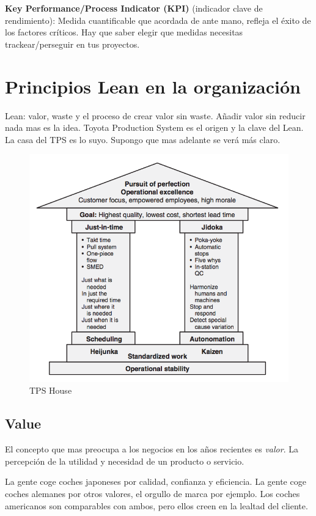 \documentclass[]{article}
\begin{document}
\textbf{Key Performance/Process Indicator (KPI)} (indicador clave de rendimiento): Medida cuantificable que acordada de ante mano, refleja el éxito de los factores críticos. Hay que saber elegir que medidas necesitas trackear/perseguir en tus proyectos. 

\section{Principios Lean en la organización}

Lean: valor, waste y el proceso de crear valor sin waste. Añadir valor sin reducir nada mas es la idea. Toyota Production System es el origen y la clave del Lean. La casa del TPS es lo suyo. Supongo que mas adelante se verá más claro.

\begin{figure}[ht!]
	\centering
	\includegraphics[width=120mm]{imagenes/TPSHouse.png}
	\caption{TPS House}
	\label{fig:TPS House}
\end{figure}

\subsection{Value}

El concepto que mas preocupa a los negocios en los años recientes es \textit{valor}. La percepción de la utilidad y necesidad de un producto o servicio. 

La gente coge coches japoneses por calidad, confianza y eficiencia. La gente coge coches alemanes por otros valores, el orgullo de marca por ejemplo. Los coches americanos son comparables con ambos, pero ellos creen en la lealtad del cliente. 
\end{document}
